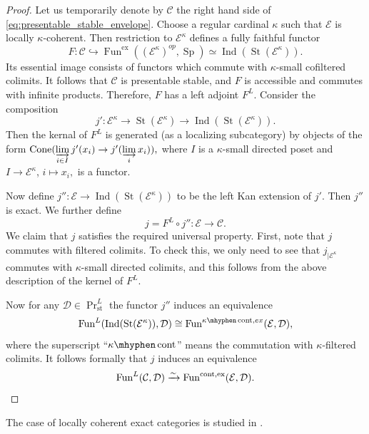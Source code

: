 \documentclass[11pt,leqno]{amsart}
\numberwithin{equation}{section}
\newcommand{\hy}{\mhyphen}
\newcommand{\indlim}[1][]{\mathop{\varinjlim}\limits_{#1}}
\newcommand{\xto}{\xrightarrow}
\newcommand{\hto}{\hookrightarrow}
\newcommand{\Cone}{\operatorname{Cone}}
\newcommand{\cont}{\operatorname{cont}}
\newcommand{\ex}{\operatorname{ex}}
\newcommand{\St}{\operatorname{St}}
\newcommand{\st}{\operatorname{st}}
\newcommand{\cD}{{\mathcal D}}
\newcommand{\cC}{{\mathcal C}}
\newcommand{\cE}{{\mathcal E}}
\newcommand{\Fun}{\operatorname{Fun}}
\newcommand{\Sp}{\operatorname{Sp}}
\newcommand{\Ind}{\operatorname{Ind}}
\begin{document}
\begin{proof}
Let us temporarily denote by $\cC$ the right hand side of \eqref{eq:presentable_stable_envelope}. Choose a regular cardinal $\kappa$ such that $\cE$ is locally $\kappa$-coherent. Then restriction to $\cE^{\kappa}$ defines a fully faithful functor
\begin{equation*}
F:\cC\hto \Fun^{\ex}((\cE^{\kappa})^{op},\Sp)\simeq \Ind(\St(\cE^{\kappa})).
\end{equation*}
Its essential image consists of functors which commute with $\kappa$-small cofiltered colimits. It follows that $\cC$ is presentable stable, and $F$ is accessible and commutes with infinite products. Therefore, $F$ has a left adjoint $F^L.$  Consider the composition
\begin{equation*}
j':\cE^{\kappa}\to\St(\cE^{\kappa})\to \Ind(\St(\cE^{\kappa})).
\end{equation*}
Then the kernal of $F^L$ is generated (as a localizing subcategory) by objects of the form $\Cone(\indlim[i\in I]j'(x_i)\to j'(\indlim[i] x_i)),$ where $I$ is a $\kappa$-small directed poset and $I\to\cE^{\kappa}$, $i\mapsto x_i,$ is a functor.

Now define $j'':\cE\to\Ind(\St(\cE^{\kappa}))$ to be the left Kan extension of $j'.$ Then $j''$ is exact. We further define
\begin{equation*}
j=F^L\circ j'':\cE\to \cC.
\end{equation*}
We claim that $j$ satisfies the required universal property. First, note that $j$ commutes with filtered colimits. To check this, we only need to see that $j_{\mid \cE^{\kappa}}$ commutes with $\kappa$-small directed colimits, and this follows from the above description of the kernel of $F^L.$

Now for any $\cD\in\Pr^L_{\st}$ the functor $j''$ induces an equivalence
\begin{equation*}
\Fun^L(\Ind(\St(\cE^{\kappa})),\cD)\cong \Fun^{\kappa\hy\cont,ex}(\cE,\cD),
\end{equation*}
where the superscript ``$\kappa\hy\cont$'' means the commutation with $\kappa$-filtered colimits. It follows formally that $j$ induces an equivalence
\begin{equation*}
\Fun^L(\cC,\cD)\xto{\sim}\Fun^{\cont,\ex}(\cE,\cD). \qedhere
\end{equation*}
\end{proof}

The case of locally coherent exact categories is studied in \cite{NW25}.
\end{document}
